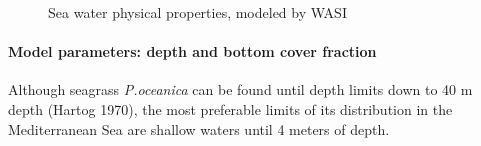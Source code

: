 \documentclass[10pt, a4paper]{article}
\begin{document}
\begin{figure}[h]
	\centering
	\caption{Sea water physical properties, modeled by WASI}
	\label{fig:4.8}
\end{figure}

\paragraph{Model parameters: depth and bottom cover fraction}
Although seagrass \textit{P.oceanica} can be found until depth limits down to 40 m depth (Hartog
1970), the most preferable limits of its distribution in the Mediterranean Sea are shallow waters until
4 meters of depth. 
\end{document}
